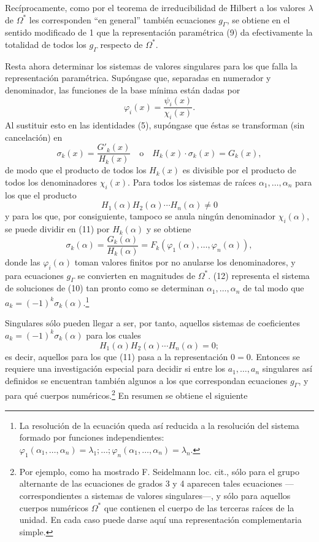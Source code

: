 \documentclass[11pt]{article}
\begin{document}
Recíprocamente, como por el teorema de irreducibilidad de Hilbert a los valores $\lambda$ de $\Omega^*$ les corresponden ``en general'' también ecuaciones $g_\Gamma$, se obtiene en el sentido modificado de 1 que la representación paramétrica (9) da efectivamente la totalidad de todos los $g_\Gamma$ respecto de $\Omega^*$.

Resta ahora determinar los sistemas de valores singulares para los que falla la representación paramétrica. Supóngase que, separadas en numerador y denominador, las funciones de la base mínima están dadas por
\[
\varphi_i(x)=\frac{\psi_i(x)}{\chi_i(x)}.
\]
Al sustituir esto en las identidades (5), supóngase que éstas se transforman (sin cancelación) en
\begin{equation}\tag{11}
\sigma_k(x)=\frac{G'_k(x)}{H_k(x)}\quad\text{o}\quad H_k(x)\cdot\sigma_k(x)=G_k(x),
\end{equation}
de modo que el producto de todos los $H_k(x)$ es divisible por el producto de todos los denominadores $\chi_i(x)$. Para todos los sistemas de raíces $\alpha_1,
\ldots,\alpha_n$ para los que el producto
\[
H_1(\alpha)H_2(\alpha)\cdots H_n(\alpha)\ne0
\]
y para los que, por consiguiente, tampoco se anula ningún denominador $\chi_i(\alpha)$, se puede dividir en (11) por $H_k(\alpha)$ y se obtiene
\begin{equation}\tag{12}
\sigma_k(\alpha)=\frac{G_k(\alpha)}{H_k(\alpha)}=F_k(\varphi_1(\alpha),\ldots,\varphi_n(\alpha)),
\end{equation}
donde las $\varphi_i(\alpha)$ toman valores finitos por no anularse los denominadores, y para ecuaciones $g_\Gamma$ se convierten en magnitudes de $\Omega^*$. (12) representa el sistema de soluciones de (10) tan pronto como se determinan $\alpha_1,
\ldots,\alpha_n$ de tal modo que $a_k=(-1)^k\sigma_k(\alpha)$.\footnote{La resolución de la ecuación queda así reducida a la resolución del sistema formado por funciones independientes:
$\varphi_1(\alpha_1,
\ldots,\alpha_n)=\lambda_1;\ldots;\varphi_n(\alpha_1,
\ldots,\alpha_n)=\lambda_n$.}

Singulares sólo pueden llegar a ser, por tanto, aquellos sistemas de coeficientes $a_k=(-1)^k\sigma_k(\alpha)$ para los cuales
\[
H_1(\alpha)H_2(\alpha)\cdots H_n(\alpha)=0;
\]
es decir, aquellos para los que (11) pasa a la representación $0=0$. Entonces se requiere una investigación especial para decidir si entre los $a_1,
\ldots,a_n$ singulares así definidos se encuentran también algunos a los que correspondan ecuaciones $g_\Gamma$, y para qué cuerpos numéricos.\footnote{Por ejemplo, como ha mostrado F. Seidelmann loc. cit., sólo para el grupo alternante de las ecuaciones de grados 3 y 4 aparecen tales ecuaciones ---correspondientes a sistemas de valores singulares---, y sólo para aquellos cuerpos numéricos $\Omega^*$ que contienen el cuerpo de las terceras raíces de la unidad. En cada caso puede darse aquí una representación complementaria simple.} En resumen se obtiene el siguiente
\end{document}
